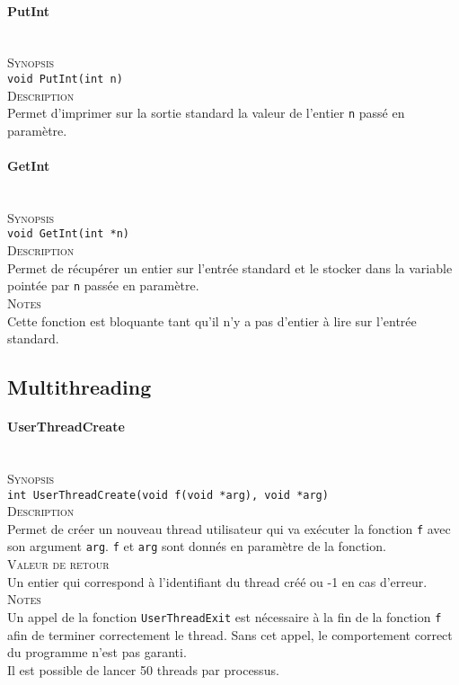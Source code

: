 \documentclass{report}
\newcommand{\myparagraph}[1]{\paragraph*{#1}\mbox{}\\}
\begin{document}
	
	
	
\myparagraph{PutInt}

\textsc{Synopsis}\\
	\texttt{void PutInt(int n)}\\
	
\textsc{Description}\\
	Permet d'imprimer sur la sortie standard la valeur de l'entier \texttt{n} passé en paramètre.\\
	

\myparagraph{GetInt}

\textsc{Synopsis}\\
	\texttt{void GetInt(int *n)}\\
	
\textsc{Description}\\
	Permet de récupérer un entier sur l'entrée standard et le stocker dans la variable pointée par \texttt{n} passée en paramètre.\\
	
\textsc{Notes}\\
	Cette fonction est bloquante tant qu'il n'y a pas d'entier à lire sur l'entrée standard.
	

\subsection*{Multithreading}
\myparagraph{UserThreadCreate}

\textsc{Synopsis}\\
	\texttt{int UserThreadCreate(void f(void *arg), void *arg)}\\
	
\textsc{Description}\\
	Permet de créer un nouveau thread utilisateur qui va exécuter la fonction \texttt{f} avec son argument \texttt{arg}. \texttt{f} et \texttt{arg} sont donnés en paramètre de la fonction.\\
	
\textsc{Valeur de retour}\\
	Un entier qui correspond à l'identifiant du thread créé ou -1 en cas d'erreur.\\
	
\textsc{Notes}\\
	Un appel de la fonction \texttt{UserThreadExit} est nécessaire à la fin de la fonction \texttt{f} afin de terminer correctement le thread. Sans cet appel, le comportement correct du programme n'est pas garanti.\\
	Il est possible de lancer 50 threads par processus.
\end{document}
